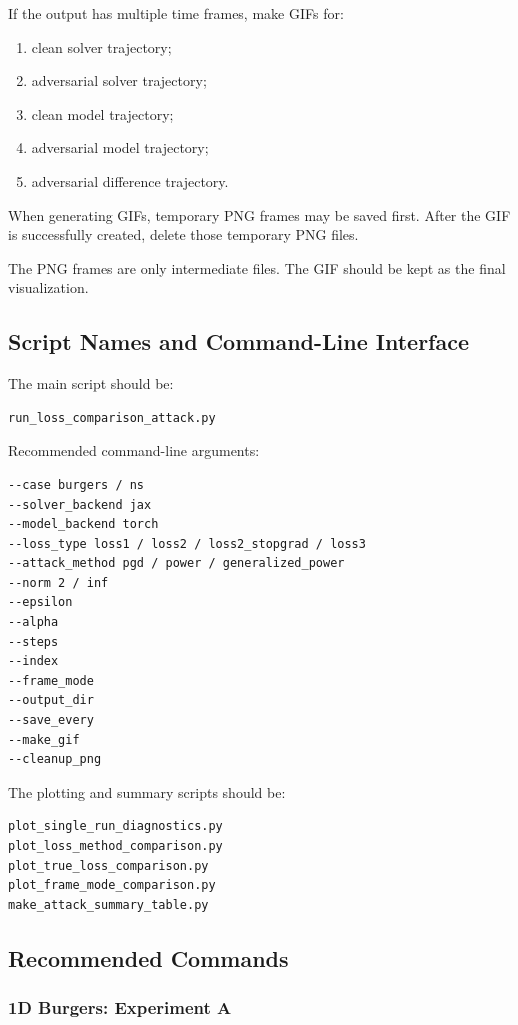 \documentclass{article}
\begin{document}
If the output has multiple time frames, make GIFs for:

\begin{enumerate}
    \item clean solver trajectory;
    \item adversarial solver trajectory;
    \item clean model trajectory;
    \item adversarial model trajectory;
    \item adversarial difference trajectory.
\end{enumerate}

When generating GIFs, temporary PNG frames may be saved first. After the GIF is successfully created, delete those temporary PNG files.

The PNG frames are only intermediate files. The GIF should be kept as the final visualization.

\subsection{Script Names and Command-Line Interface}

The main script should be:

\begin{verbatim}
run_loss_comparison_attack.py
\end{verbatim}

Recommended command-line arguments:

\begin{verbatim}
--case burgers / ns
--solver_backend jax
--model_backend torch
--loss_type loss1 / loss2 / loss2_stopgrad / loss3
--attack_method pgd / power / generalized_power
--norm 2 / inf
--epsilon
--alpha
--steps
--index
--frame_mode
--output_dir
--save_every
--make_gif
--cleanup_png
\end{verbatim}

The plotting and summary scripts should be:

\begin{verbatim}
plot_single_run_diagnostics.py
plot_loss_method_comparison.py
plot_true_loss_comparison.py
plot_frame_mode_comparison.py
make_attack_summary_table.py
\end{verbatim}

\subsection{Recommended Commands}

\subsubsection{1D Burgers: Experiment A}
\end{document}
